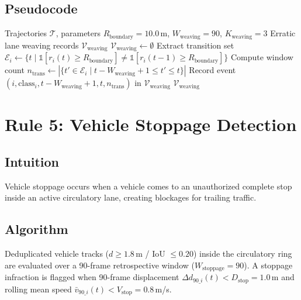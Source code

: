 \documentclass[12pt,a4paper]{report}
\begin{document}
\subsection{Pseudocode}
\begin{algorithm}[H]
\caption{Erratic Lane Weaving Detection Algorithm}
\label{alg:rule4}
\begin{algorithmic}[1]
\Require Trajectories $\mathcal{T}$, parameters $R_{\text{boundary}} = 10.0$\,m, $W_{\text{weaving}} = 90$, $K_{\text{weaving}} = 3$
\Ensure Erratic lane weaving records $\mathcal{V}_{\text{weaving}}$
\State $\mathcal{V}_{\text{weaving}} \gets \emptyset$
    \State Extract transition set $\mathcal{E}_i \gets \{t \mid \mathbb{1}[r_i(t) \ge R_{\text{boundary}}] \neq \mathbb{1}[r_i(t-1) \ge R_{\text{boundary}}]\}$
        \State Compute window count $n_{\text{trans}} \gets |\{t' \in \mathcal{E}_i \mid t - W_{\text{weaving}} + 1 \le t' \le t\}|$
            \State Record event $(i, \text{class}_i, t - W_{\text{weaving}} + 1, t, n_{\text{trans}})$ in $\mathcal{V}_{\text{weaving}}$
        \EndIf
    \EndFor
\EndFor
\State \Return $\mathcal{V}_{\text{weaving}}$
\end{algorithmic}
\end{algorithm}

\section{Rule 5: Vehicle Stoppage Detection}
\label{sec:rule5}

\subsection{Intuition}
Vehicle stoppage occurs when a vehicle comes to an unauthorized complete stop inside an active circulatory lane, creating blockages for trailing traffic.

\subsection{Algorithm}
Deduplicated vehicle tracks ($d \ge 1.8$\,m / IoU $\le 0.20$) inside the circulatory ring are evaluated over a 90-frame retrospective window ($W_{\text{stoppage}} = 90$). A stoppage infraction is flagged when 90-frame displacement $\Delta d_{90\_i}(t) < D_{\text{stop}} = 1.0$\,m and rolling mean speed $\bar{v}_{90\_i}(t) < V_{\text{stop}} = 0.8$\,m/s.
\end{document}
